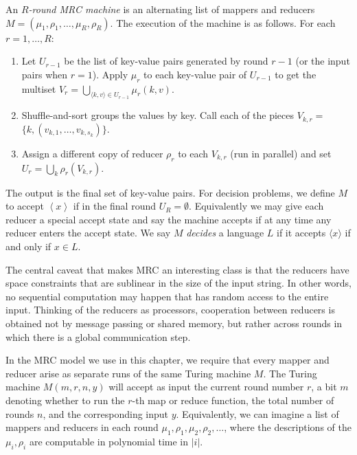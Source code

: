 \begin{definition}
An \emph{$R$-round MRC machine} is an alternating list of mappers and reducers
$M = (\mu_1, \rho_1, \dots, \mu_R, \rho_R)$. The execution of the machine is as
follows.
For each $r = 1, \dots, R$:
\begin{enumerate}
  \item Let $U_{r-1}$ be the list of key-value pairs generated by round $r-1$
(or the input pairs when $r=1$). Apply $\mu_r$ to each key-value pair of
$U_{r-1}$ to get the multiset $V_r = \bigcup_{\langle k,v \rangle \in U_{r-1}}
\mu_r(k, v).$

  \item Shuffle-and-sort groups the values by key. Call each of the pieces $V_{k,r} =$
$\{ k, (v_{k,1}, \dots, v_{k,s_k})\}.$

  \item Assign a different copy of reducer $\rho_r$ to each $V_{k,r}$ (run in
parallel) and set $U_r = \bigcup_{k}\rho_r(V_{k,r})$.
\end{enumerate}
\end{definition}

The output is the final set of key-value pairs. For decision problems, we
define $M$ to accept $\left \langle x \right \rangle$ if in the final round
$U_R = \emptyset$. Equivalently we may give each reducer a special accept state
and say the machine accepts if at any time any reducer enters the accept state.
We say $M$ \emph{decides} a language $L$ if it accepts $\langle x \rangle$ if
and only if $x \in L$.

The central caveat that makes MRC an interesting class is that the reducers
have space constraints that are sublinear in the size of the input string. In
other words, no sequential computation may happen that has random access to the
entire input. Thinking of the reducers as processors, cooperation between
reducers is obtained not by message passing or shared memory, but rather across
rounds in which there is a global communication step.

In the MRC model we use in this chapter, we require that every mapper and reducer
arise as separate runs of the same Turing machine $M$. The Turing machine $M(m,
r, n, y)$ will accept as input the current round number $r$, a bit $m$ denoting
whether to run the $r$-th map or reduce function, the total number of rounds
$n$, and the corresponding input $y$.  Equivalently, we can imagine a list of
mappers and reducers in each round $\mu_1, \rho_1, \mu_2, \rho_2, \dots$, where
the descriptions of the $\mu_i, \rho_i$ are computable in
polynomial time in $|i|$. 

